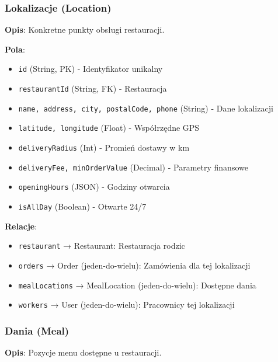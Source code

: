 \documentclass[12pt,a4paper,utf-8]{article}
\begin{document}
\subsubsection{Lokalizacje (Location)}

\textbf{Opis}: Konkretne punkty obsługi restauracji.

\textbf{Pola}:
\begin{itemize}
    \item \texttt{id} (String, PK) - Identyfikator unikalny
    \item \texttt{restaurantId} (String, FK) - Restauracja
    \item \texttt{name, address, city, postalCode, phone} (String) - Dane lokalizacji
    \item \texttt{latitude, longitude} (Float) - Współrzędne GPS
    \item \texttt{deliveryRadius} (Int) - Promień dostawy w km
    \item \texttt{deliveryFee, minOrderValue} (Decimal) - Parametry finansowe
    \item \texttt{openingHours} (JSON) - Godziny otwarcia
    \item \texttt{isAllDay} (Boolean) - Otwarte 24/7
\end{itemize}

\textbf{Relacje}:
\begin{itemize}
    \item \texttt{restaurant} → Restaurant: Restauracja rodzic
    \item \texttt{orders} → Order (jeden-do-wielu): Zamówienia dla tej lokalizacji
    \item \texttt{mealLocations} → MealLocation (jeden-do-wielu): Dostępne dania
    \item \texttt{workers} → User (jeden-do-wielu): Pracownicy tej lokalizacji
\end{itemize}

\subsubsection{Dania (Meal)}

\textbf{Opis}: Pozycje menu dostępne u restauracji.
\end{document}

